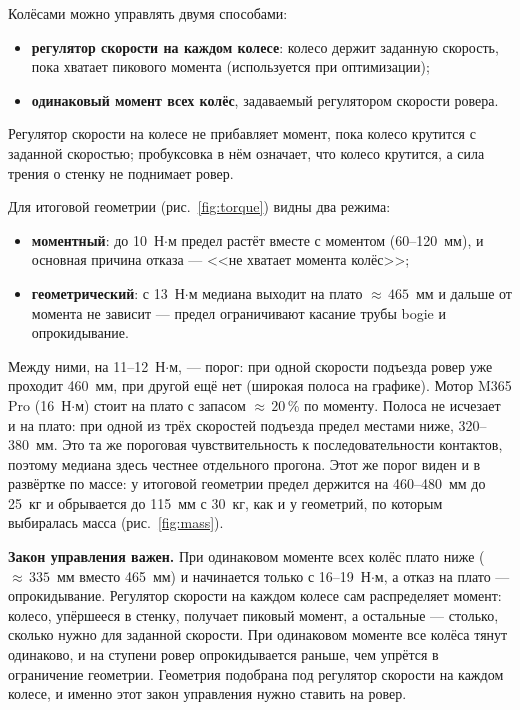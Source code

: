 \documentclass[11pt,a4paper]{article}
\begin{document}
Колёсами можно управлять двумя способами:
\begin{itemize}
  \item \textbf{регулятор скорости на каждом колесе}: колесо держит заданную скорость,
        пока хватает пикового момента (используется при оптимизации);
  \item \textbf{одинаковый момент всех колёс}, задаваемый регулятором скорости ровера.
\end{itemize}
Регулятор скорости на колесе не прибавляет момент, пока колесо крутится с заданной скоростью;
пробуксовка в нём означает, что колесо крутится, а сила трения о стенку не поднимает ровер.

Для итоговой геометрии (рис.~\ref{fig:torque}) видны два режима:
\begin{itemize}
  \item \textbf{моментный}: до 10~Н$\cdot$м предел растёт вместе с моментом (60--120~мм),
        и основная причина отказа --- <<не хватает момента колёс>>;
  \item \textbf{геометрический}: с 13~Н$\cdot$м медиана выходит на плато ${\approx}\,465$~мм и дальше
        от момента не зависит --- предел ограничивают касание трубы bogie и опрокидывание.
\end{itemize}
Между ними, на 11--12~Н$\cdot$м, --- порог: при одной скорости подъезда ровер уже проходит
460~мм, при другой ещё нет (широкая полоса на графике). Мотор M365 Pro (16~Н$\cdot$м) стоит
на плато с запасом ${\approx}\,20$\,\% по моменту. Полоса не исчезает и на плато: при одной
из трёх скоростей подъезда предел местами ниже, 320--380~мм. Это та же пороговая
чувствительность к последовательности контактов, поэтому медиана здесь честнее отдельного
прогона. Этот же порог виден и в развёртке по массе:
у итоговой геометрии предел держится на 460--480~мм до 25~кг и обрывается до 115~мм с 30~кг,
как и у геометрий, по которым выбиралась масса (рис.~\ref{fig:mass}).

\textbf{Закон управления важен.} При одинаковом моменте всех колёс плато ниже
(${\approx}\,335$~мм вместо 465~мм) и начинается только с 16--19~Н$\cdot$м, а отказ на плато ---
опрокидывание. Регулятор скорости на каждом колесе сам распределяет момент: колесо, упёршееся
в стенку, получает пиковый момент, а остальные --- столько, сколько нужно для заданной скорости.
При одинаковом моменте все колёса тянут одинаково, и на ступени ровер опрокидывается раньше,
чем упрётся в ограничение геометрии. Геометрия подобрана под регулятор скорости на каждом
колесе, и именно этот закон управления нужно ставить на ровер.
\end{document}
